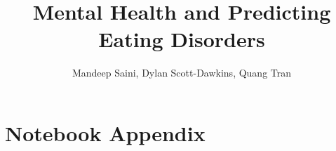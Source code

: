 \documentclass[stu,12pt,floatsintext]{apa7}
\title{Mental Health and Predicting Eating Disorders} %
\author{Mandeep Saini, Dylan Scott-Dawkins, Quang Tran}
\begin{document}
\maketitle %
\doublespacing







\printbibliography

\appendix %

\section{Notebook Appendix} %

\end{document}
